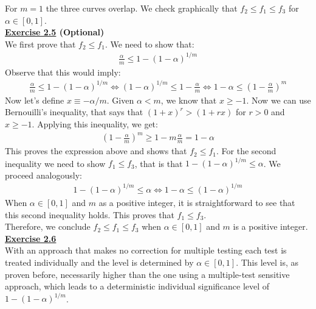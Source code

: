 \documentclass[a4paper, 11pt]{article}
\begin{document}
For $m=1$ the three curves overlap. We check graphically that $f_2 \leq f_1 \leq f_3$ for $\alpha \in [0,1]$.\\
\newline \textbf{\underline{Exercise 2.5} (Optional)}\\
\newline We first prove that $f_2 \leq f_1$. We need to show that:
\begin{eqnarray}
\frac{\alpha}{m} \leq 1 - (1 - \alpha)^{1/m} \nonumber
\end{eqnarray}
Observe that this would imply:
\begin{eqnarray}
\frac{\alpha}{m} \leq 1 - (1 - \alpha)^{1/m} \Leftrightarrow  (1 - \alpha)^{1/m} \leq 1 - \frac{\alpha}{m} \Leftrightarrow 1 - \alpha \leq \left( 1 - \frac{\alpha}{m} \right)^{m} \nonumber
\end{eqnarray}
Now let's define $x \equiv -\alpha / m$. Given $\alpha < m$, we know that $x \geq -1$. Now we can use Bernouilli's inequality, that says that $(1+x)^r > (1+rx)$ for $r>0$ and $x \geq -1$. Applying this inequality, we get:
\begin{eqnarray}
\left( 1 - \frac{\alpha}{m} \right)^{m} \geq 1 - m \frac{\alpha}{m} = 1 - \alpha \nonumber
\end{eqnarray}
This proves the expression above and shows that $f_2 \leq f_1$. For the second inequality we need to show $f_1 \leq f_3$, that is that $1 - (1 - \alpha)^{1/m} \leq \alpha$. We proceed analogously:
\begin{eqnarray}
1 - (1 - \alpha)^{1/m} \leq \alpha \Leftrightarrow  1 - \alpha \leq (1 - \alpha)^{1/m} \nonumber
\end{eqnarray}
When $\alpha \in [0,1]$ and $m$ as a positive integer, it is straightforward to see that this second inequality holds. This proves that $f_1 \leq f_3$.\\
\newline Therefore, we conclude $f_2 \leq f_1 \leq f_3$ when $\alpha \in [0,1]$ and $m$ is a positive integer.\\
\newline \textbf{\underline{Exercise 2.6}}\\
\newline With an approach that makes no correction for multiple testing each test is treated individually and the level is determined by $\alpha \in [0,1]$. This level is, as proven before, necessarily higher than the one using a multiple-test sensitive approach, which leads to a deterministic individual significance level of $1 - (1- \alpha)^{1/m}$.\\
\end{document}
